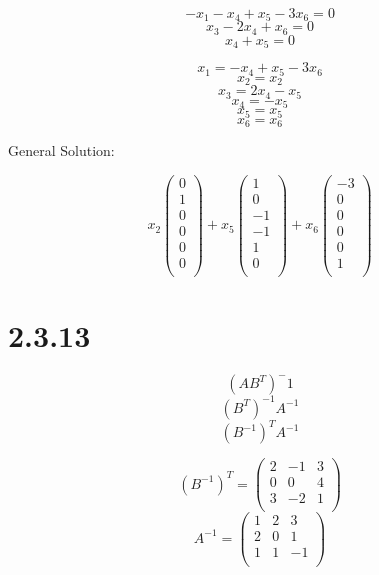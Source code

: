 \documentclass{article}
\begin{document}
\newpage

\[	-x_{1}-x_{4}+x_{5}-3x_{6} = 0		\]
\[	x_{3}-2x_{4}+x_{6} = 0				\]
\[	x_{4} + x_{5} = 0					\]

\[	x_{1} = -x_{4}+x_{5}-3x_{6}			\]
\[	x_{2} = x_{2}						\]
\[	x_{3} = 2x_{4} - x_{5}				\]
\[	x_{4} = -x_{5}						\]
\[	x_{5} = x_{5}						\]
\[	x_{6} = x_{6}						\]

General Solution:

\[
	x_{2}\left(
		\begin{array}{c}
			0\\
			1\\
			0\\
			0\\
			0\\
			0\\
		\end{array}
	\right) + 
	x_{5}\left(
		\begin{array}{c}
			1\\
			0\\
			-1\\
			-1\\
			1\\
			0\\
		\end{array}
	\right) +
	x_{6}\left(
		\begin{array}{c}
			-3\\
			0\\
			0\\
			0\\
			0\\
			1\\
		\end{array}
	\right)
\]
\newpage

\section*{2.3.13}

\[	(AB^T)^-1	\]
\[	(B^{T})^{-1}A^{-1}	\]
\[	(B^{-1})^{T}A^{-1}	\]

\[
	(B^{-1})^{T} = \left(
		\begin{array}{ccc}
			2&	-1&	3\\
			0&	0&	4\\
			3&	-2&	1\\
		\end{array}
	\right)
\]
\[
	A^{-1} = \left(
		\begin{array}{ccc}
			1&	2&	3\\
			2&	0&	1\\
			1&	1&	-1\\
		\end{array}
	\right)
\]
\end{document}
